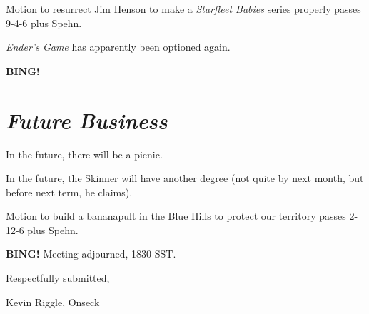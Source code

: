 \documentclass[10pt]{article}
\newcommand{\bing}{{\bf BING!} }
\newcommand{\goto}[1]{\bing \vskip 12pt \section*{{\em{#1}}}}
\newcommand{\ps}{ plus Spehn\xspace}
\begin{document}
Motion to resurrect Jim Henson to make a \emph{Starfleet Babies} series properly passes 9-4-6\ps.

\emph{Ender's Game} has apparently been optioned again.

\goto{Future Business}

In the future, there will be a picnic.

In the future, the Skinner will have another degree (not quite by next month, but before next term,
he claims).

Motion to build a bananapult in the Blue Hills to protect our territory passes 2-12-6\ps.

\bing
\noindent
Meeting adjourned, 1830 SST.

\vspace{18pt}

\centerline{Respectfully submitted,}
\centerline{Kevin Riggle, Onseck}
\end{document}

